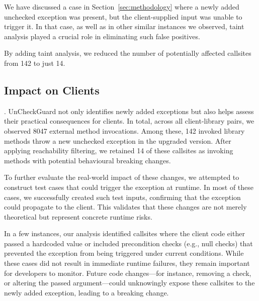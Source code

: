 We have discussed a case in Section~\ref{sec:methodology} where a newly added unchecked exception was present, but the client-supplied input was unable to trigger it. In that case, as well as in other similar instances we observed, taint analysis played a crucial role in eliminating such false positives.

\vspace{1em}
\begin{tcolorbox}[colback=gray!10, colframe=black]
By adding taint analysis, we reduced the number of potentially affected callsites from 142 to just 14.
\end{tcolorbox}
\vspace{1em}


\subsection{Impact on Clients}

.
UnCheckGuard not only identifies newly added exceptions but also helps assess their practical consequences for clients. In total, across all client-library pairs, we observed 8047 external method invocations. Among these, 142 invoked library methods throw a new unchecked exception in the upgraded version. After applying reachability filtering, we retained 14 of these callsites as invoking methods with potential behavioural breaking changes. 

To further evaluate the real-world impact of these changes, we attempted to construct test cases that could trigger the exception at runtime. In most of these cases, we successfully created such test inputs, confirming that the exception could propagate to the client. This validates that these changes are not merely theoretical but represent concrete runtime risks.

In a few instances, our analysis identified callsites where the client code either passed a hardcoded value or included precondition checks (e.g., null checks) that prevented the exception from being triggered under current conditions. While these cases did not result in immediate runtime failures, they remain important for developers to monitor. Future code changes—for instance, removing a check, or altering the passed argument—could unknowingly expose these callsites to the newly added exception, leading to a breaking change.

